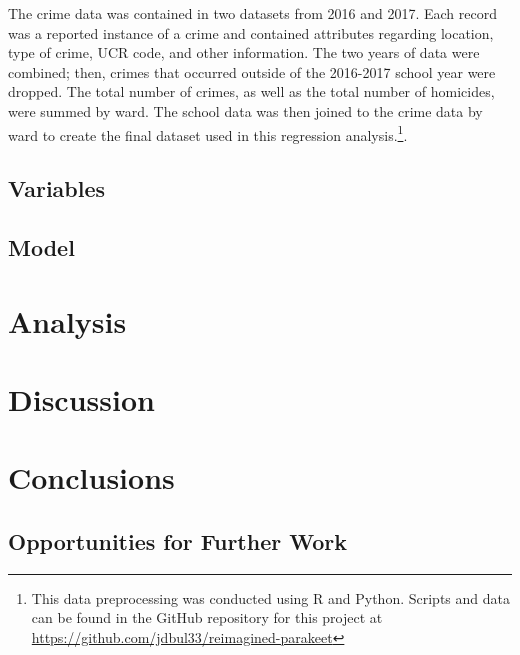 \documentclass[12pt]{article}
\begin{document}
\par

The crime data was contained in two datasets from 2016 and 2017.  Each record was a reported instance of a crime and contained attributes regarding location, type of crime, UCR code, and other information.  The two years of data were combined; then, crimes that occurred outside of the 2016-2017 school year were dropped.  The total number of crimes, as well as the total number of homicides, were summed by ward.  The school data was then joined to the crime data by ward to create the final dataset used in this regression analysis.\footnote{This data preprocessing was conducted using R and Python.  Scripts and data can be found in the GitHub repository for this project at \href{https://github.com/jdbul33/reimagined-parakeet}{https://github.com/jdbul33/reimagined-parakeet}}.


\subsection{Variables}


\subsection{Model}



	\section{Analysis}
	


	\section{Discussion}



	\section{Conclusions}


\subsection{Opportunities for Further Work}
\end{document}
